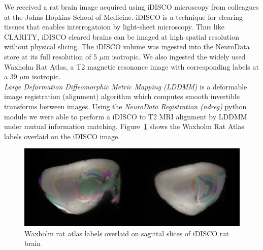 \documentclass[simplex.tex]{subfiles}
\begin{document}
%


We received a rat brain image acquired using iDISCO microscopy from colleagues at the Johns Hopkins School of Medicine. 
iDISCO is a technique for clearing tissues that enables interrogatoion by light-sheet microscopy. 
Thus like CLARITY, iDISCO cleared brains can be imaged at high spatial resolution without physical slicing.
The iDISCO volume was ingested into the NeuroData store at its full resolution of 5 $\mu$m isotropic.
We also ingested the widely used Waxholm Rat Atlas, a T2 magnetic resonance image with corresponding labels at a 39 $\mu$m isotropic.\\

\textit{Large Deformation Diffeomorphic Metric Mapping (LDDMM)} is a deformable image registration (alignment) algorithm which computes smooth invertible transforms between images.
Using the \textit{NeuroData Registration (ndreg)} python module we were able to perform a iDISCO to T2 MRI alignment by LDDMM under mutual information matching.
Figure~\ref{fig:idisco} shows the Waxholm Rat Atlas labels overlaid on the iDISCO image.

\begin{figure}[!h]
 \begin{cframed}
  \centering
   \includegraphics[width=\textwidth]{../../figs/iDISCO.png}  
   \caption{Waxholm rat atlas labels overlaid on sagittal slices of iDISCO rat brain}
  \label{fig:idisco}
 \end{cframed}
\end{figure}
\end{document}

